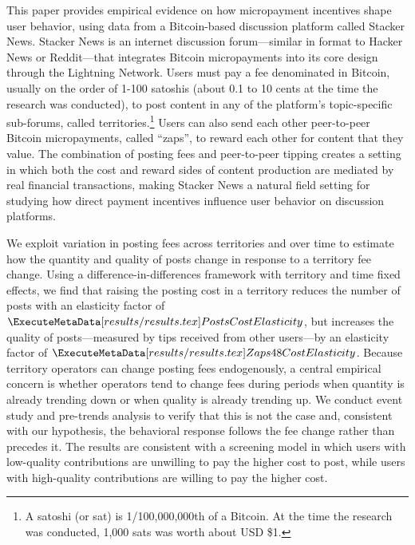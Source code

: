 This paper provides empirical evidence on how micropayment incentives shape user behavior, using data from a Bitcoin-based discussion platform called Stacker News. Stacker News is an internet discussion forum---similar in format to Hacker News or Reddit---that integrates Bitcoin micropayments into its core design through the Lightning Network. Users must pay a fee denominated in Bitcoin, usually on the order of 1-100 satoshis (about 0.1 to 10 cents at the time the research was conducted), to post content in any of the platform's topic-specific sub-forums, called territories.\footnote{A satoshi (or sat) is 1/100,000,000th of a Bitcoin. At the time the research was conducted, 1,000 sats was worth about USD \$1.} Users can also send each other peer-to-peer Bitcoin micropayments, called ``zaps'', to reward each other for content that they value. The combination of posting fees and peer-to-peer tipping creates a setting in which both the cost and reward sides of content production are mediated by real financial transactions, making Stacker News a natural field setting for studying how direct payment incentives influence user behavior on discussion platforms.

We exploit variation in posting fees across territories and over time to estimate how the quantity and quality of posts change in response to a territory fee change. Using a difference-in-differences framework with territory and time fixed effects, we find that raising the posting cost in a territory reduces the number of posts with an elasticity factor of $\gn{PostsCostElasticity}$, but increases the quality of posts---measured by tips received from other users---by an elasticity factor of $\gn{Zaps48CostElasticity}$. Because territory operators can change posting fees endogenously, a central empirical concern is whether operators tend to change fees during periods when quantity is already trending down or when quality is already trending up. We conduct event study and pre-trends analysis to verify that this is not the case and, consistent with our hypothesis, the behavioral response follows the fee change rather than precedes it. The results are consistent with a screening model in which users with low-quality contributions are unwilling to pay the higher cost to post, while users with high-quality contributions are willing to pay the higher cost.

